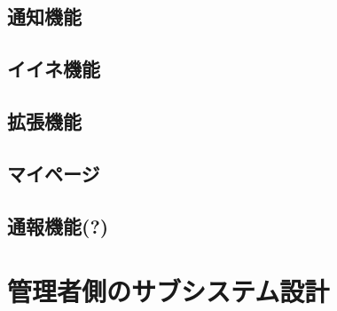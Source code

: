 \documentclass[a4j]{jarticle}
\begin{document}
\subsection{通知機能}

\subsection{イイネ機能}

\subsection{拡張機能}

\subsection{マイページ}

\subsection{通報機能(?)}


\section{管理者側のサブシステム設計}
\end{document}
